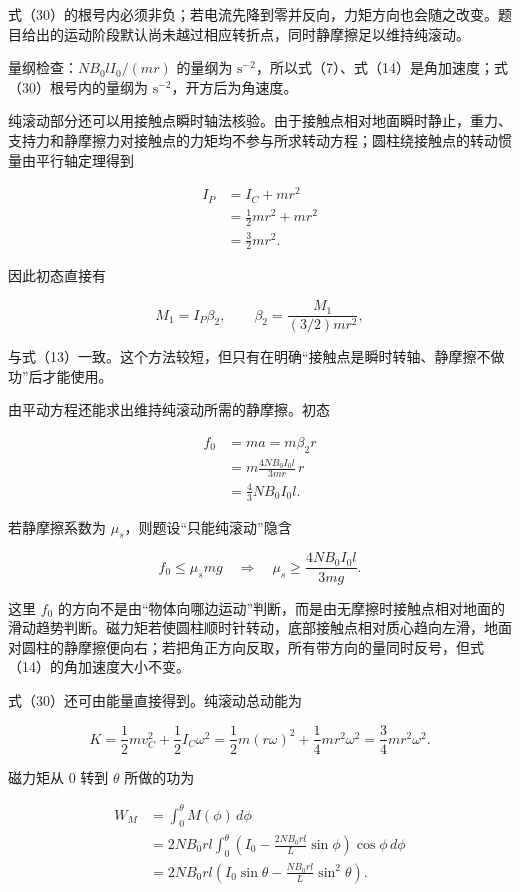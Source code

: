 \documentclass[12pt,a4paper,UTF8]{ctexart}
\begin{document}
式（30）的根号内必须非负；若电流先降到零并反向，力矩方向也会随之改变。题目给出的运动阶段默认尚未越过相应转折点，同时静摩擦足以维持纯滚动。

量纲检查：\(NB_0lI_0/(mr)\) 的量纲为
\(\mathrm s^{-2}\)，所以式（7）、式（14）是角加速度；式（30）根号内的量纲为
\(\mathrm s^{-2}\)，开方后为角速度。

纯滚动部分还可以用接触点瞬时轴法核验。由于接触点相对地面瞬时静止，重力、支持力和静摩擦力对接触点的力矩均不参与所求转动方程；圆柱绕接触点的转动惯量由平行轴定理得到

\[
\begin{aligned}
I_P
&=I_C+mr^2\\
&=\frac12mr^2+mr^2\\
&=\frac32mr^2. 
\end{aligned} \tag{32}
\]

因此初态直接有

\[
M_1=I_P\beta_2,
\qquad
\beta_2=\frac{M_1}{(3/2)mr^2}, \tag{33}
\]

与式（13）一致。这个方法较短，但只有在明确``接触点是瞬时转轴、静摩擦不做功''后才能使用。

由平动方程还能求出维持纯滚动所需的静摩擦。初态

\[
\begin{aligned}
f_0
&=ma=m\beta_2r\\
&=m\frac{4NB_0I_0l}{3mr}\,r\\
&=\frac43NB_0I_0l.
\end{aligned} \tag{34}
\]

若静摩擦系数为 \(\mu_s\)，则题设``只能纯滚动''隐含

\[
f_0\leqslant\mu_smg
\quad\Longrightarrow\quad
\mu_s\geqslant\frac{4NB_0I_0l}{3mg}. \tag{35}
\]

这里 \(f_0\)
的方向不是由``物体向哪边运动''判断，而是由无摩擦时接触点相对地面的滑动趋势判断。磁力矩若使圆柱顺时针转动，底部接触点相对质心趋向左滑，地面对圆柱的静摩擦便向右；若把角正方向反取，所有带方向的量同时反号，但式（14）的角加速度大小不变。

式（30）还可由能量直接得到。纯滚动总动能为

\[
K=\frac12mv_C^2+\frac12I_C\omega^2
=\frac12m(r\omega)^2+\frac14mr^2\omega^2
=\frac34mr^2\omega^2. \tag{36}
\]

磁力矩从 \(0\) 转到 \(\theta\) 所做的功为

\[
\begin{aligned}
W_M
&=\int_0^\theta M(\phi)\,d\phi\\
&=2NB_0rl\int_0^\theta
\left(I_0-\frac{2NB_0rl}{L}\sin\phi\right)
\cos\phi\,d\phi\\
&=2NB_0rl
\left(I_0\sin\theta-\frac{NB_0rl}{L}\sin^2\theta\right).
\end{aligned} \tag{37}
\]
\end{document}
